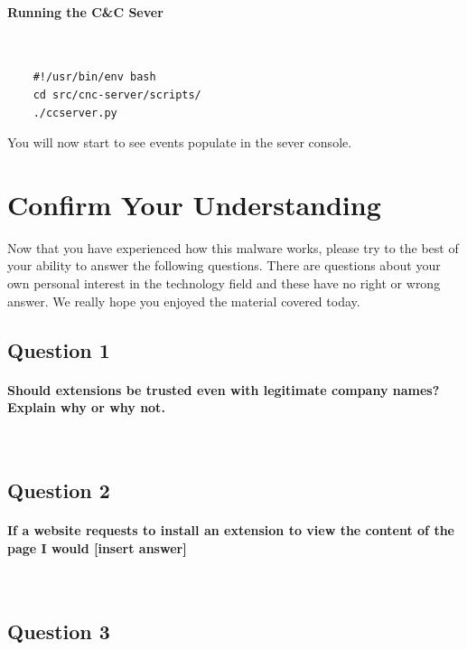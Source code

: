 \documentclass{article}
\newcommand\tab[1][0.5cm]{\hspace*{#1}}
\begin{document}
\paragraph{Running the C\&C Sever}\mbox{}\\
\begin{tcolorbox}[title=run-cnc-server.sh]
  \begin{verbatim}
    #!/usr/bin/env bash
    cd src/cnc-server/scripts/
    ./ccserver.py
  \end{verbatim}
\end{tcolorbox}
\tab You will now start to see events populate in the sever console.

\pagebreak

\section{Confirm Your Understanding}
\tab Now that you have experienced how this malware works, please try to the best of your ability to answer the following questions. There are questions about your own personal interest in the technology field and these have no right or wrong answer. We really hope you enjoyed the material covered today.

\subsection{Question 1}
\paragraph{Should extensions be trusted even with legitimate company names? Explain why or why not.}\mbox{}\\
\newline
\framebox[\textwidth]{\rule{0pt}{80pt}}

\subsection{Question 2}
\paragraph{If a website requests to install an extension to view the content of the page I would [insert answer]}\mbox{}\\
\newline
\framebox[\textwidth]{\rule{0pt}{80pt}}

\subsection{Question 3}
\end{document}
